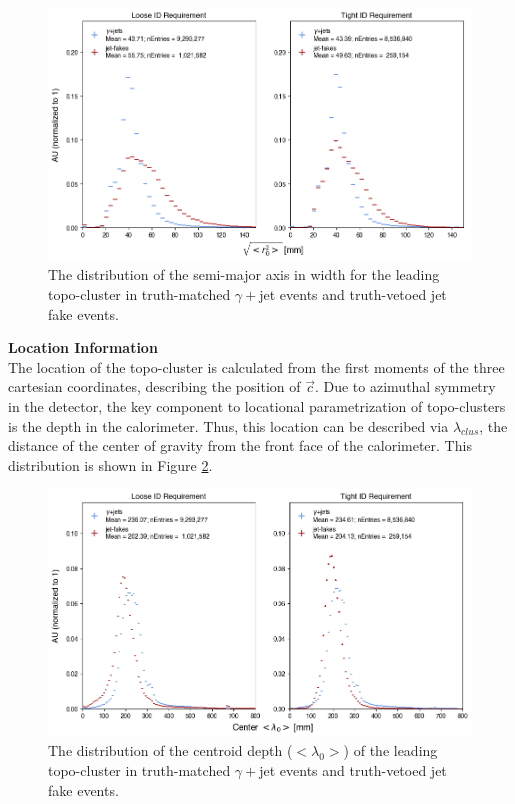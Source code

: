 \begin{figure}[!thp]
    \centering 
    \includegraphics[width=.9\textwidth]{chapters/chapter4_photonID/images/hists/y_topoCluster0_secondR.png}
    \caption[The distribution of the semi-major axis in width for the leading topo-cluster]{The distribution of the semi-major axis in width for the leading topo-cluster in truth-matched $\gamma+$jet events and truth-vetoed jet fake events.}
    \label{fig:topo-secondR}
\end{figure}



\noindent\textbf{Location Information}\\
\indent The location of the topo-cluster is calculated from the first moments of the three cartesian coordinates, describing the position of $\vec{c}$. Due to azimuthal symmetry in the detector, the key component to locational parametrization of topo-clusters is the depth in the calorimeter. Thus, this location can be described via $\lambda_{clus}$, the distance of the center of gravity from the front face of the calorimeter. This distribution is shown in Figure \ref{fig:topo-centerLambda}.

\begin{figure}[!thp]
    \centering 
    \includegraphics[width=.9\textwidth]{chapters/chapter4_photonID/images/hists/y_topoCluster0_centerLambda.png}
    \caption[The distribution of the centroid depth ($<\lambda_{0}>$) of the leading topo-cluster]{The distribution of the centroid depth ($<\lambda_{0}>$) of the leading topo-cluster in truth-matched $\gamma+$jet events and truth-vetoed jet fake events.}
    \label{fig:topo-centerLambda}
\end{figure}

